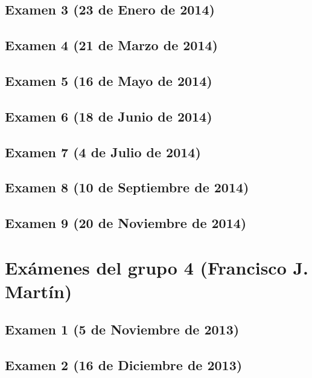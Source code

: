 \documentclass[a4paper,12pt,twoside]{book}
\begin{document}
\subsection{Examen 3 (23 de Enero de 2014)}
 \label{examen_13_14_3_3}
\subsection{Examen 4 (21 de Marzo de 2014)}
\subsection{Examen 5 (16 de Mayo de 2014)}
\subsection{Examen 6 (18 de Junio de 2014)}
 \label{examen_13_14_3_6}
\subsection{Examen 7 (4 de Julio de 2014)}
 \label{examen_13_14_3_7}
\subsection{Examen 8 (10 de Septiembre de 2014)}
 \label{examen_13_14_3_8}
\subsection{Examen 9 (20 de Noviembre de 2014)}
 \label{examen_13_14_3_9}

\section{Exámenes del grupo 4 (Francisco J. Martín)}
\subsection{Examen 1 (5 de Noviembre de 2013)}
\subsection{Examen 2 (16 de Diciembre de 2013)}
\end{document}
